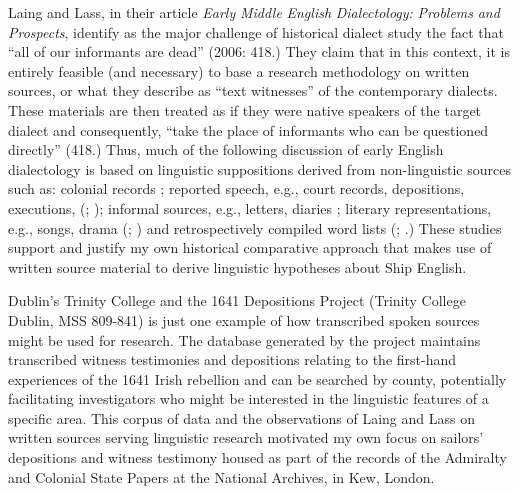 Laing and Lass, in their article \textit{Early} \textit{Middle} \textit{English} \textit{Dialectology:} \textit{Problems} \textit{and} \textit{Prospects}, identify as the major challenge of historical dialect study the fact that “all of our informants are dead” (2006: 418.) They claim that in this context, it is entirely feasible (and necessary) to base a research methodology on written sources, or what they describe as “text witnesses” of the contemporary dialects. These materials are then treated as if they were native speakers of the target dialect and consequently, “take the place of informants who can be questioned directly” (418.) Thus, much of the following discussion of early English dialectology is based on linguistic suppositions derived from non-linguistic sources such as: colonial records \citep{Maynor1988}; reported speech, e.g., court records, depositions, executions, (\citealt{Awbery1988}; \citealt{Tagliamonte2013}); informal sources, e.g., letters, diaries \citep{Tagliamonte2013}; literary representations, e.g., songs, drama (\citealt{Russell1883}; \citealt{Wright1967}) and retrospectively compiled word lists (\citealt{Wright1967}; \citealt{Smith1968}.) These studies support and justify my own historical comparative approach that makes use of written source material to derive linguistic hypotheses about Ship English. 

Dublin’s Trinity College and the 1641 Depositions Project (Trinity College Dublin, MSS 809-841) is just one example of how transcribed spoken sources might be used for research. The database generated by the project maintains transcribed witness testimonies and depositions relating to the first-hand experiences of the 1641 Irish rebellion and can be searched by county, potentially facilitating investigators who might be interested in the linguistic features of a specific area. This corpus of data and the observations of Laing and Lass on written sources serving linguistic research motivated my own focus on sailors’ depositions and witness testimony housed as part of the records of the Admiralty and Colonial State Papers at the National Archives, in Kew, London. 

